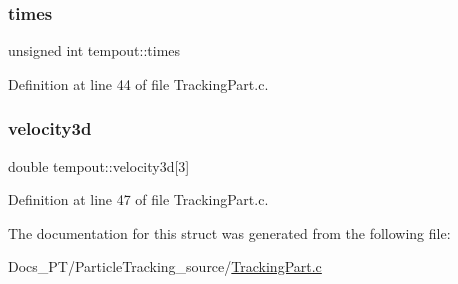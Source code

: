 \subsubsection{\texorpdfstring{times}{times}}
{\footnotesize\ttfamily unsigned int tempout\+::times}



Definition at line 44 of file Tracking\+Part.\+c.

\mbox{\label{structtempout_abc348407152ab976840ee50d46164a83}} 
\subsubsection{\texorpdfstring{velocity3d}{velocity3d}}
{\footnotesize\ttfamily double tempout\+::velocity3d\mbox{[}3\mbox{]}}



Definition at line 47 of file Tracking\+Part.\+c.



The documentation for this struct was generated from the following file\+:\begin{DoxyCompactItemize}
\item 
Docs\+\_\+\+P\+T/\+Particle\+Tracking\+\_\+source/\mbox{\hyperlink{_tracking_part_8c}{Tracking\+Part.\+c}}\end{DoxyCompactItemize}
